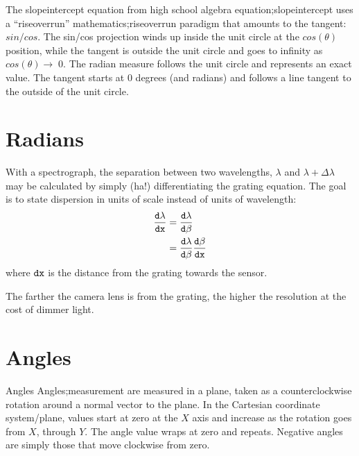 \documentclass[letterpaper,10pt,english,openany,oneside]{sphinxmanual}
\begin{document}
\sphinxAtStartPar
The slope\sphinxhyphen{}intercept equation from high school algebra
equation;slope\sphinxhyphen{}intercept uses a “rise\sphinxhyphen{}over\sphinxhyphen{}run”
mathematics;rise\sphinxhyphen{}over\sphinxhyphen{}run paradigm that amounts to the
tangent: \(sin/cos\). The sin/cos projection winds up inside the
unit circle at the \(cos(\theta)\) position, while the tangent is
outside the unit circle and goes to infinity as \(cos(\theta)
\rightarrow\;0\). The radian measure follows the unit circle and
represents an exact value. The tangent starts at 0 degrees (and
radians) and follows a line tangent to the outside of the unit circle.


\section{Radians}
\label{\detokenize{mathematics:radians}}
\sphinxAtStartPar
With a spectrograph, the separation between two wavelengths, \(\lambda\)
and \(\lambda+\Delta{\lambda}\) may be calculated by simply (ha!)
differentiating the grating equation. The goal is to state
dispersion in units of scale instead of units of wavelength:
\begin{equation}\label{equation:mathematics:ChainRule1}
\begin{split}\frac{\tt{d}\lambda}{\tt{d}x} &= \frac{\tt{d}\lambda}{\tt{d}\beta} \\
            &= \frac{\tt{d}\lambda}{\tt{d}\beta} \frac{\tt{d}\beta}{\tt{d}x}\end{split}
\end{equation}
\sphinxAtStartPar
where \(\tt{d}x\) is the distance from the grating towards the
sensor.

\sphinxAtStartPar
The farther the camera lens is from the grating, the higher the resolution
at the cost of dimmer light.


\section{Angles}
\label{\detokenize{mathematics:angles}}
\sphinxAtStartPar
Angles Angles;measurement are measured in a plane, taken as a
counter\sphinxhyphen{}clockwise rotation around a normal vector to the plane. In the
Cartesian coordinate system/plane, values start at zero at the
\(X\) axis and increase as the rotation goes from \(X\),
through \(Y\). The angle value wraps at zero and repeats. Negative
angles are simply those that move clockwise from zero.
\end{document}
